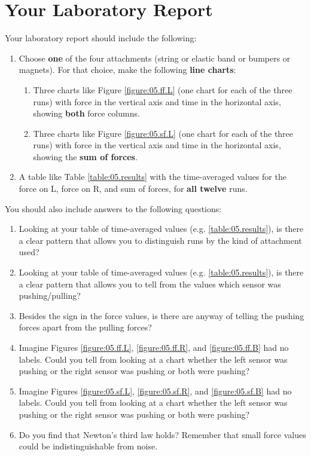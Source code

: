 \section{Your Laboratory Report}
Your laboratory report should include the following:
\begin{enumerate}
    \item Choose \textbf{one} of the four attachments (string or elastic band or bumpers or magnets). For that choice, make the following \textbf{line charts}:
    \begin{enumerate}
        \item Three charts like Figure \ref{figure:05.ff.L} (one chart for each of the three runs) with force in the vertical axis and time in the horizontal axis, showing \textbf{both} force columns.
        \item Three charts like Figure \ref{figure:05.sf.L} (one chart for each of the three runs) with force in the vertical axis and time in the horizontal axis, showing the \textbf{sum of forces}.
    \end{enumerate}
    \item A table like Table \ref{table:05.results} with the time-averaged values for the force on L, force on R, and sum of forces, for \textbf{all twelve} runs.
\end{enumerate}
You should also include answers to the following questions:
\begin{enumerate}
    \item Looking at your table of time-averaged values (e.g. \ref{table:05.results}), is there a clear pattern that allows you to distinguish runs by the kind of attachment used?
    \item Looking at your table of time-averaged values (e.g. \ref{table:05.results}), is there a clear pattern that allows you to tell from the values which sensor was pushing/pulling?
    \item Besides the sign in the force values, is there are anyway of telling the pushing forces apart from the pulling forces?
    \item Imagine Figures \ref{figure:05.ff.L}, \ref{figure:05.ff.R}, and \ref{figure:05.ff.B} had no labels. Could you tell from looking at a chart whether the left sensor was pushing or the right sensor was pushing or both were pushing?
    \item Imagine Figures \ref{figure:05.sf.L}, \ref{figure:05.sf.R}, and \ref{figure:05.sf.B} had no labels. Could you tell from looking at a chart whether the left sensor was pushing or the right sensor was pushing or both were pushing?
    \item Do you find that Newton's third law holds? Remember that small force values could be indistinguishable from noise.
\end{enumerate}
\newpage
